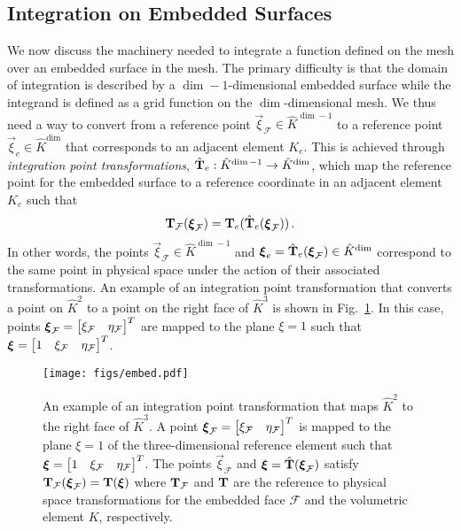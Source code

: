 \documentclass[../doc.tex]{subfiles}
\begin{document}
\subsection{Integration on Embedded Surfaces}
We now discuss the machinery needed to integrate a function defined on the mesh over an embedded surface in the mesh. The primary difficulty is that the domain of integration is described by a $\dim-1$-dimensional embedded surface while the integrand is defined as a grid function on the $\dim$-dimensional mesh. We thus need a way to convert from a reference point $\vec{\xi}_\mathcal{F} \in \hat{K}^{\dim-1}$ to a reference point $\vec{\xi}_e \in \hat{K}^{\dim}$ that corresponds to an adjacent element $K_e$. This is achieved through \emph{integration point transformations}, $\hat{\boldsymbol{\mathrm{T}}}_e : \hat{K}^{\dim-1} \rightarrow \hat{K}^{\dim}$, which map the reference point for the embedded surface to a reference coordinate in an adjacent element $K_e$ such that 
	\begin{equation}
		\boldsymbol{\mathrm{T}}_\mathcal{F}(\boldsymbol{\xi}_\mathcal{F}) = \boldsymbol{\mathrm{T}}_e(\hat{\boldsymbol{\mathrm{T}}}_e(\boldsymbol{\xi}_\mathcal{F})) \,. 
	\end{equation}
In other words, the points $\vec{\xi}_\mathcal{F} \in \hat{K}^{\dim-1}$ and $\boldsymbol{\xi}_e = \hat{\boldsymbol{\mathrm{T}}}_e(\boldsymbol{\xi}_\mathcal{F}) \in \hat{K}^{\dim}$ correspond to the same point in physical space under the action of their associated transformations. An example of an integration point transformation that converts a point on $\hat{K}^{2}$ to a point on the right face of $\hat{K}^3$ is shown in Fig.~\ref{fem:embed_diag}. In this case, points $\boldsymbol{\xi}_\mathcal{F} = \begin{bmatrix} \xi_\mathcal{F} & \eta_\mathcal{F} \end{bmatrix}^T$ are mapped to the plane $\xi=1$ such that $\boldsymbol{\xi} = \begin{bmatrix} 1 & \xi_\mathcal{F} & \eta_\mathcal{F} \end{bmatrix}^T$. 
\begin{figure}
\centering
\texttt{[image: figs/embed.pdf]}
\caption{An example of an integration point transformation that maps $\hat{K}^2$ to the right face of $\hat{K}^3$. A point $\boldsymbol{\xi}_\mathcal{F} = \begin{bmatrix} \xi_\mathcal{F} & \eta_\mathcal{F} \end{bmatrix}^T$ is mapped to the plane $\xi=1$ of the three-dimensional reference element such that $\boldsymbol{\xi} = \begin{bmatrix} 1 & \xi_\mathcal{F} & \eta_\mathcal{F} \end{bmatrix}^T$. The points $\vec{\xi}_\mathcal{F}$ and $\boldsymbol{\xi} = \hat{\boldsymbol{\mathrm{T}}}(\boldsymbol{\xi}_\mathcal{F})$ satisfy $\boldsymbol{\mathrm{T}}_\mathcal{F}(\boldsymbol{\xi}_\mathcal{F}) = \boldsymbol{\mathrm{T}}(\boldsymbol{\xi})$ where $\boldsymbol{\mathrm{T}}_\mathcal{F}$ and $\boldsymbol{\mathrm{T}}$ are the reference to physical space transformations for the embedded face $\mathcal{F}$ and the volumetric element $K$, respectively. }
\label{fem:embed_diag}
\end{figure}
\end{document}
